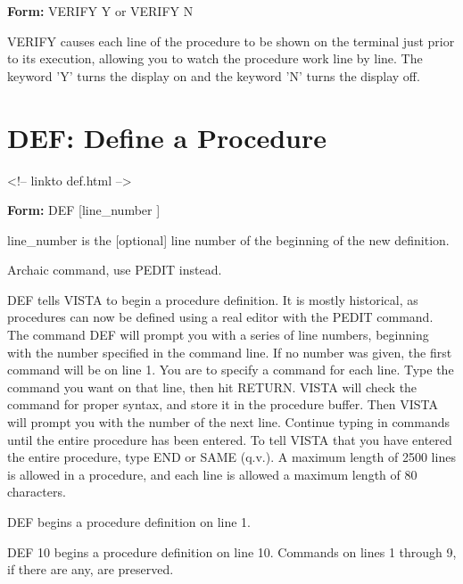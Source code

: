 \begin{command}
  \item[\textbf{Form: } VERIFY Y or VERIFY N\hfill]{}
\end{command}
VERIFY causes each line of the procedure to be shown on the terminal just
prior to its execution, allowing you to watch the procedure work line by
line.  The keyword 'Y' turns the display on and the keyword 'N' turns the
display off.

\section{DEF: Define a Procedure}
\begin{rawhtml}
<!-- linkto def.html -->
\end{rawhtml}
\begin{command} 
  \item[\textbf{Form: } DEF [line\_number]\hfill]{}
  \item[line\_number]{is the [optional] line number of the
beginning of the new definition.}
\end{command}

Archaic command, use PEDIT instead.

DEF tells VISTA to begin a procedure definition. It is mostly historical,
as procedures can now be defined using a real editor with the PEDIT
command. The command DEF will prompt you with a series of line numbers,
beginning with the number specified in the command line.  If no number was
given, the first command will be on line 1.  You are to specify a command
for each line.  Type the command you want on that line, then hit RETURN.
VISTA will check the command for proper syntax, and store it in the
procedure buffer. Then VISTA will prompt you with the number of the next
line.  Continue typing in commands until the entire procedure has been
entered.  To tell VISTA that you have entered the entire procedure, type
END or SAME (q.v.).  A maximum length of 2500 lines is allowed in a
procedure, and each line is allowed a maximum length of 80 characters.

\begin{example}
  \item[DEF\hfill]{begins a procedure definition on line 1.}
  \item[DEF 10\hfill]{begins a procedure definition on line 10.  
       Commands on lines 1 through 9, if there are any, are preserved.}
\end{example}

